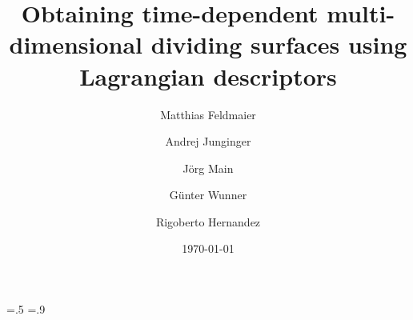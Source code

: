 \documentclass{elsarticle}
\begin{document}
\newlength\figurewide
\ifFIGoneColumn
  \figurewide=.5\columnwidth
\else
  \figurewide=.9\columnwidth
\fi

\title{Obtaining time-dependent multi-dimensional dividing surfaces 
using Lagrangian descriptors}

\author[itp1]{Matthias Feldmaier}
\author[itp1]{Andrej Junginger}
\author[itp1]{J\"org Main}
\author[itp1]{G\"unter Wunner}
\address[itp1]{%
Institut f\"ur Theoretische Physik 1, 
Universit\"at Stuttgart, 
70550 Stuttgart,
Germany}
\author[jhu]{Rigoberto Hernandez}
\address[jhu]{%
  Department of Chemistry,
  Johns Hopkins University,
  Baltimore, MD 21218, USA
}


\date{\today}
\newcommand{\EQ}{Eq.}
\newcommand{\EQS}{Eqs.}
\newcommand{\FIG}{Fig.}
\newcommand{\FIGS}{Figs.}
\newcommand{\REF}{Ref.}
\newcommand{\REFS}{Refs.}
\newcommand{\SEC}{Sec.}
\newcommand{\SECS}{Secs.}
\newcommand{\eg}{e.\,g.}
\newcommand{\cf}{cf.}
\newcommand{\ie}{i.\,e.}
\newcommand{\ud}{\mathrm{d}}
\newcommand{\ue}{\mathrm{e}}
\newcommand{\kB}{k_\mathrm{B}}
\newcommand{\VLiCN}{V_\mathrm{LiCN}}
\newcommand{\VCN}{V_\mathrm{C-N}}
\newcommand{\VLi}{V_\mathrm{Li-CN}}
\renewcommand{\vec}[1]{\boldsymbol{#1}}
\newcommand{\qq}{\vec{q}}
\newcommand{\xx}{\vec{x}}
\newcommand{\vv}{\vec{v}}
\newcommand{\transpose}{\mathsf{T}}
\newcommand{\reactantpop}{\mathcal{P}}
\newcommand{\kf}{k_\mathrm{f}}
\newcommand{\etal}{\emph{et al.}}
\newcommand{\LD}{\mathcal{L}}
\newcommand{\LDf}{\LD^\text{(f)}}
\newcommand{\LDb}{\LD^\text{(b)}}
\newcommand{\LDfb}{\LD^\text{(fb)}}
\newcommand{\LDfbw}{\LD^\text{(fbw)}}
\newcommand{\Ws}{\mathcal{W}_\text{s}}
\newcommand{\Wu}{\mathcal{W}_\text{u}}
\newcommand{\Wsu}{\mathcal{W}_\text{s,u}}
\newcommand{\TSt}{\mathcal{T}}
\newcommand{\weightingf}{\chi^\text{(f)}}
\newcommand{\weightingb}{\chi^\text{(b)}}
\newcommand{\weightingfb}{\chi^\text{(f,b)}}
\newcommand{\vtherm}{v_\text{therm}}
\newcommand{\comment}[1]{\textsf{\textcolor{orange}{[#1]}}}
\newcommand{\sno}[1]{_\mathrm{#1}}
\newcommand{\no}[1]{\mathrm{#1}}
\newcommand{\acnew}[1]{\acfi{#1}\acused{#1}}
\newcommand{\atomicmass}{m_\text{u}}
\end{document}
